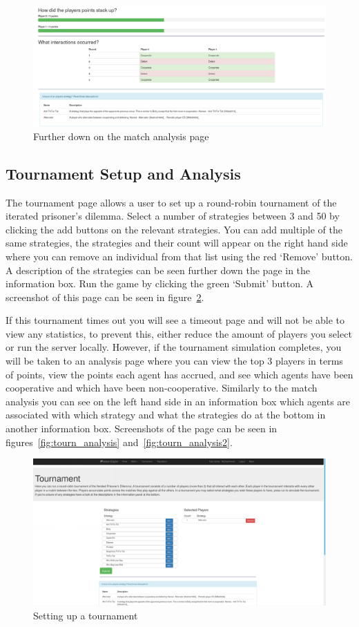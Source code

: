 \documentclass[]{final_report}
\begin{document}
\begin{figure}
	\includegraphics[width=\textwidth]{MatchAnalysis.png}
	\caption{Further down on the match analysis page}
	\label{fig:match_analysis}
\end{figure}

\subsection{Tournament Setup and Analysis}
The tournament page allows a user to set up a round-robin tournament of the iterated prisoner's dilemma. Select a number of strategies between 3 and 50 by clicking the add buttons on the relevant strategies. You can add multiple of the same strategies, the strategies and their count will appear on the right hand side where you can remove an individual from that list using the red `Remove' button. A description of the strategies can be seen further down the page in the information box. Run the game by clicking the green `Submit' button. A screenshot of this page can be seen in figure~\ref{fig:tourn_setup}.\par 
If this tournament times out you will see a timeout page and will not be able to view any statistics, to prevent this, either reduce the amount of players you select or run the server locally. However, if the tournament simulation completes, you will be taken to an analysis page where you can view the top 3 players in terms of points, view the points each agent has accrued, and see which agents have been cooperative and which have been non-cooperative. Similarly to the match analysis you can see on the left hand side in an information box which agents are associated with which strategy and what the strategies do at the bottom in another information box. Screenshots of the page can be seen in figures~\ref{fig:tourn_analysis} and~\ref{fig:tourn_analysis2}.
\begin{figure}
	\includegraphics[width=\textwidth]{TournSetup.png}
	\caption{Setting up a tournament}
	\label{fig:tourn_setup}
\end{figure}
\end{document}
